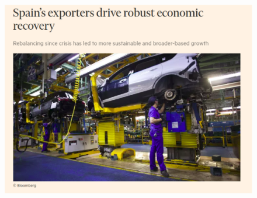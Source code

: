 \documentclass{beamer}
\begin{document}
\begin{frame}
  \begin{figure}
    \includegraphics[scale=.4]{spain2.eps}
  \end{figure}
\end{frame}

\end{document}
